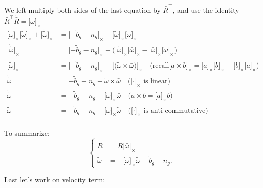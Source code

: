 \documentclass[letter,10pt]{article}
\newcommand{\asym}[1]{{\lbrack #1\rbrack}_\times{}}
\begin{document}
We left-multiply both sides of the last equation by $\bar R^\top$, and use the identity $\bar R^\top\dot{\bar R}=\asym{\bar\omega}$
\begin{equation}
\begin{aligned}
 \asym{\bar \omega}\asym{\tilde \omega} + \asym{\dot{\tilde\omega}} &= \asym{-\tilde b_g - n_g} + \asym{\tilde\omega}\asym{\bar\omega}\\
 \asym{\dot{\tilde\omega}} &= \asym{-\tilde b_g - n_g} 
 + \big(\asym{\tilde\omega}\asym{\bar\omega} - \asym{\bar\omega}\asym{\tilde\omega}\big) \\
 \asym{\dot{\tilde\omega}} &= \asym{-\tilde b_g - n_g} + \asym{\big(\tilde\omega\times\bar\omega\big)} \quad\text{(recall} \asym{a\times b}=\asym{a}\asym{b}-\asym{b}\asym{a}\text{)}\\
\dot{\tilde\omega} &= -\tilde b_g - n_g + \tilde\omega\times\bar\omega \quad\text{(}\asym{\cdot} \text{ is linear)} \\
\dot{\tilde\omega} &= -\tilde b_g - n_g + \asym{\tilde\omega}\bar\omega \quad\text{(}a\times b=\asym{a}b \text{)}\\
\dot{\tilde\omega} &= -\tilde b_g - n_g - \asym{\bar\omega}\tilde\omega \quad\text{(}\asym{\cdot} \text{ is anti-commutative)}\\
\end{aligned}
\end{equation}

To summarize:
\begin{equation}
\begin{cases}
 \dot{\bar R} &= \bar R \asym{\bar \omega}\\
\dot{\tilde\omega} &= - \asym{\bar\omega}\tilde\omega -\tilde b_g - n_g.
\end{cases}
\end{equation}

Last let's work on velocity term:
\end{document}

